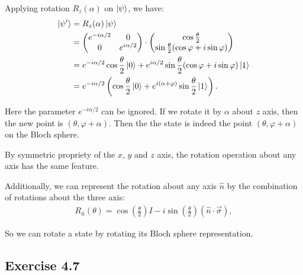 Applying rotation $R_z(\alpha)$ on $\ket{\psi}$, we have:
\begin{align}
    \ket{\psi'}&=R_z(\alpha)\ket{\psi}\\
    &=\begin{pmatrix}
    e^{-i\alpha/2} & 0 \\ 0 &e^{i\alpha/2}
    \end{pmatrix}\cdot
    \begin{pmatrix}
    \cos\frac{\theta}{2}\\\sin\frac{\theta}{2}(\cos\varphi+i\sin\varphi)
    \end{pmatrix}\\
    &= e^{-i\alpha/2}\cos\frac{\theta}{2}\ket{0}+e^{i\alpha/2}\sin\frac{\theta}{2}(\cos\varphi+i\sin\varphi)\ket{1}\\
    &=e^{-i\alpha/2}\left(\cos\frac{\theta}{2}\ket{0}+e^{i(\alpha+\varphi)}\sin\frac{\theta}{2}\ket{1}\right).
\end{align}

Here the parameter $e^{-i\alpha/2}$ can be ignored. If we rotate it by $\alpha$ about $z$ axis, then the new point is $(\theta,\varphi+\alpha)$. Then the the state is indeed the point $(\theta,\varphi+\alpha)$ on the Bloch sphere.

By symmetric propriety of the $x$, $y$ and $z$ axis, the rotation operation about any axis has the same feature. 

Additionally, we can represent the rotation about any axis $\hat n$ by the combination of rotations about the three axis:
\begin{align}
    R_{\hat n}(\theta)=\cos\left(\frac{\theta}{2}\right)I-i\sin\left(\frac{\theta}{2}\right)(\hat{n}\cdot \vec\sigma),
\end{align}

So we can rotate a state by rotating its Bloch sphere representation.

\subsection*{Exercise 4.7}

